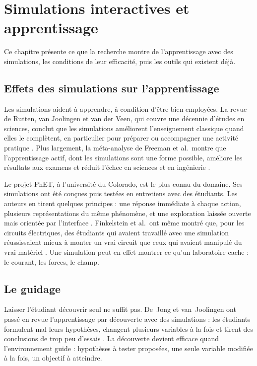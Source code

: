 
\chapter{Simulations interactives et apprentissage}\label{chap:simulations}

Ce chapitre présente ce que la recherche montre de l'apprentissage avec des
simulations, les conditions de leur efficacité, puis les outils qui existent
déjà.

\section{Effets des simulations sur l'apprentissage}

Les simulations aident à apprendre, à condition d'être bien employées. La
revue de Rutten, van Joolingen et van der Veen, qui couvre une décennie
d'études en sciences, conclut que les simulations améliorent l'enseignement
classique quand elles le complètent, en particulier pour préparer ou
accompagner une activité pratique \cite{rutten2012}. Plus largement, la
méta-analyse de Freeman et al.~montre que l'apprentissage actif, dont les
simulations sont une forme possible, améliore les résultats aux examens et
réduit l'échec en sciences et en ingénierie \cite{freeman2014}.

Le projet PhET, à l'université du Colorado, est le plus connu du domaine.
Ses simulations ont été conçues puis testées en entretiens avec des
étudiants. Les auteurs en tirent quelques principes : une réponse immédiate à
chaque action, plusieurs représentations du même phénomène, et une
exploration laissée ouverte mais orientée par l'interface
\cite{wieman2008phet, adams2008phet}. Finkelstein et al.~ont même montré que,
pour les circuits électriques, des étudiants qui avaient travaillé avec une
simulation réussissaient mieux à monter un vrai circuit que ceux qui avaient
manipulé du vrai matériel \cite{finkelstein2005}. Une simulation peut en effet
montrer ce qu'un laboratoire cache : le courant, les forces, le champ.

\section{Le guidage}

Laisser l'étudiant découvrir seul ne suffit pas. De~Jong et van~Joolingen ont
passé en revue l'apprentissage par découverte avec des simulations : les
étudiants formulent mal leurs hypothèses, changent plusieurs variables à la
fois et tirent des conclusions de trop peu d'essais \cite{dejong1998}. La
découverte devient efficace quand l'environnement guide : hypothèses à
tester proposées, une seule variable modifiée à la fois, un objectif à
atteindre.

